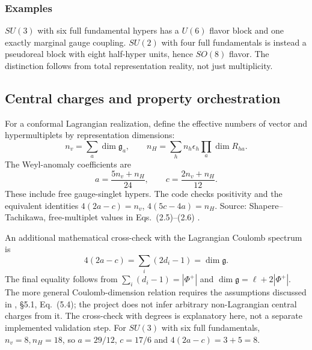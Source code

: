 \documentclass[11pt,a4paper]{article}
\numberwithin{equation}{section}
\newcommand{\src}[1]{{\small\color{muted}Source: #1.}\par}
\begin{document}
\subsubsection{Examples}
$SU(3)$ with six full fundamental hypers has a $U(6)$ flavor block and one
exactly marginal gauge coupling. $SU(2)$ with four full fundamentals is instead
a pseudoreal block with eight half-hyper units, hence $SO(8)$ flavor. The
distinction follows from total representation reality, not just multiplicity.

\clearpage
\subsection{Central charges and property orchestration}
For a conformal Lagrangian realization, define the effective numbers of vector
and hypermultiplets by representation dimensions:
\begin{equation}
 n_v=\sum_a\dim\mathfrak g_a,\qquad
 n_H=\sum_h n_h\epsilon_h\prod_a\dim R_{ha}.
 \label{eq:effective-counts}
\end{equation}
The Weyl-anomaly coefficients are
\begin{equation}
 a=\frac{5n_v+n_H}{24},\qquad
 c=\frac{2n_v+n_H}{12}.
 \label{eq:ac}
\end{equation}
These include free gauge-singlet hypers. The code checks positivity and the
equivalent identities $4(2a-c)=n_v$, $4(5c-4a)=n_H$.
\src{Shapere--Tachikawa, free-multiplet values in Eqs.~(2.5)--(2.6) \cite{st}}

An additional mathematical cross-check with the Lagrangian Coulomb spectrum is
\begin{equation}
 4(2a-c)=\sum_i(2d_i-1)=\dim\mathfrak g.
 \label{eq:ac-coulomb}
\end{equation}
The final equality follows from $\sum_i(d_i-1)=|\Phi^+|$ and
$\dim\mathfrak g=\ell+2|\Phi^+|$. The more general Coulomb-dimension relation
requires the assumptions discussed in \cite{st}, \S5.1, Eq.~(5.4); the project
does not infer arbitrary non-Lagrangian central charges from it. The cross-check
with degrees is explanatory here, not a separate implemented validation step.
For $SU(3)$ with six full fundamentals, $n_v=8,n_H=18$, so
$a=29/12$, $c=17/6$ and $4(2a-c)=3+5=8$.
\end{document}
